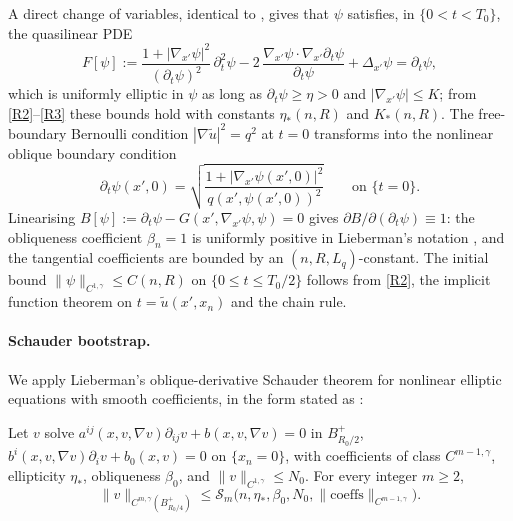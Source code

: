 A direct change of variables, identical to
\cite[(2.10)--(2.12)]{KN1977}, gives that \(\psi\) satisfies, in
\(\{0<t<T_0\}\), the quasilinear PDE
\begin{equation}\label{eq:plan1-ge-psi-PDE}
   F[\psi]
     :=\frac{1+|\nabla_{x'}\psi|^{2}}{(\partial_t\psi)^{2}}\,\partial_t^{2}\psi
        -2\,\frac{\nabla_{x'}\psi\cdot\nabla_{x'}\partial_t\psi}{\partial_t\psi}
        +\Delta_{x'}\psi
     =\partial_t\psi,
\end{equation}
which is uniformly elliptic in \(\psi\) as long as
\(\partial_t\psi\ge\eta>0\) and \(|\nabla_{x'}\psi|\le K\); from
\ref{R2}--\ref{R3} these bounds hold with constants \(\eta_*(n,R)\) and
\(K_*(n,R)\). The free-boundary Bernoulli condition
\(|\nabla\widetilde u|^2=q^2\) at \(t=0\) transforms into
the nonlinear oblique boundary condition
\begin{equation}\label{eq:plan1-ge-BC-psi}
   \partial_t\psi(x',0)
   =\sqrt{\frac{1+|\nabla_{x'}\psi(x',0)|^{2}}{q(x',\psi(x',0))^{2}}}
   \qquad\text{on }\{t=0\}.
\end{equation}
Linearising
\(B[\psi]:=\partial_t\psi-G(x',\nabla_{x'}\psi,\psi)=0\) gives
\(\partial B/\partial(\partial_t\psi)\equiv 1\): the obliqueness
coefficient \(\beta_n=1\) is uniformly positive in Lieberman's
notation \cite[\S 1]{Li86b}, and the tangential coefficients are
bounded by an \((n,R,L_q)\)-constant. The initial bound
\(\|\psi\|_{C^{1,\gamma}}\le C(n,R)\) on \(\{0\le t\le T_0/2\}\)
follows from \ref{R2}, the implicit function theorem on
\(t=\widetilde u(x',x_n)\) and the chain rule.

\paragraph{Schauder bootstrap.}
We apply Lieberman's oblique-derivative Schauder theorem for nonlinear
elliptic equations with smooth coefficients, in the form stated as
\cite[Theorem~1]{Li86b}:

\begin{theorem}
\label{thm:plan1-ge-lieberman}
Let \(v\) solve
\(a^{ij}(x,v,\nabla v)\partial_{ij}v+b(x,v,\nabla v)=0\) in
\(B_{R_0/2}^+\), \(b^i(x,v,\nabla v)\partial_i v+b_0(x,v)=0\) on
\(\{x_n=0\}\), with coefficients of class \(C^{m-1,\gamma}\), ellipticity
\(\eta_*\), obliqueness \(\beta_0\), and \(\|v\|_{C^{1,\gamma}}\le N_0\).
For every integer \(m\ge 2\),
\[
   \|v\|_{C^{m,\gamma}(B_{R_0/4}^+)}
   \le\mathcal S_m\bigl(n,\eta_*,\beta_0,N_0,\|\mathrm{coeffs}\|_{C^{m-1,\gamma}}\bigr).
\]
\end{theorem}

